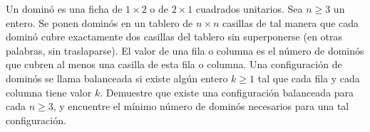 Un dominó es una ficha de $1 \times 2$ o de $2 \times 1$ cuadrados unitarios.
Sea $n \ge 3$ un entero. Se ponen dominós en un tablero de $n \times n$ casillas de tal manera que cada
dominó cubre exactamente dos casillas del tablero sin superponerse (en otras palabras, sin traslaparse).
El valor de una fila o columna es el número de dominós que cubren al menos una casilla de esta
fila o columna. Una configuración de dominós se llama balanceada si existe algún entero $k \ge 1$ tal que
cada fila y cada columna tiene valor $k$.
Demuestre que existe una configuración balanceada para cada $n \ge 3$, y encuentre el mínimo número
de dominós necesarios para una tal configuración.